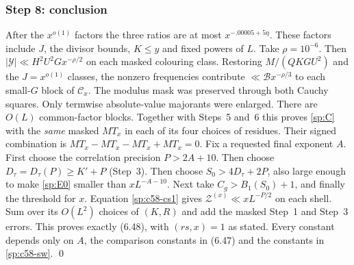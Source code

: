 \subsubsection*{Step 8: conclusion}
After the $x^{o(1)}$ factors the three ratios are at most
$x^{-.00005+5\eta}$. These factors include $J$, the divisor bounds,
$K\le y$ and fixed powers of $L$. Take $\rho=10^{-6}$. Then
$|\mathcal Y|\ll H^2U^2Gx^{-\rho/2}$ on each masked colouring class.
Restoring $M/(QKGU^2)$ and the $J=x^{o(1)}$ classes, the nonzero
frequencies contribute $\ll\mathcal Bx^{-\rho/3}$ to each small-$G$
block of $\mathcal C_x$. The modulus mask was preserved through both
Cauchy squares. Only termwise absolute-value majorants were enlarged.
There are $O(L)$ common-factor blocks. Together with Steps~5 and~6
this proves \eqref{sp:C} with the \emph{same} masked $MT_x$ in each
of its four choices of residues. Their signed combination is
$MT_x-MT_x-MT_x+MT_x=0$.
Fix a requested final exponent $A$. First choose the correlation
precision $P>2A+10$. Then choose
$D_\tau=D_\tau(P)\ge K'+P$ (Step~3). Then choose
$S_0>4D_\tau+2P$, also large enough to make \eqref{sp:E0} smaller
than $xL^{-A-10}$. Next take $C_g>B_1(S_0)+1$, and finally the
threshold for $x$. Equation \eqref{sp:c58-cs1} gives
$\mathcal Z^{(x)}\ll xL^{-P/2}$ on each shell. Sum over its
$O(L^2)$ choices of $(K,R)$ and add the masked Step~1 and Step~3
errors. This proves exactly (6.48), with $(rs,x)=1$ as stated.
Every constant depends only on $A$, the comparison constants in
(6.47) and the constants in \eqref{sp:c58-sw}.
\qed
